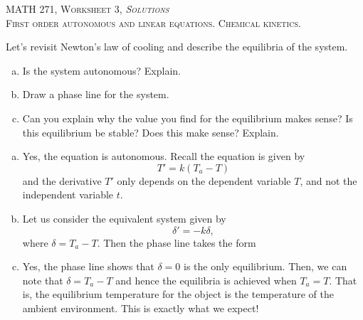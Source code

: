 \documentclass[12pt]{article} %
\begin{document}
\begin{center}
   \textsc{\large MATH 271, Worksheet 3, \emph{Solutions}}\\
   \textsc{First order autonomous and linear equations. Chemical kinetics.}
\end{center}
\vspace{.5cm}


\begin{problem}
    Let's revisit Newton's law of cooling and describe the equilibria of the system. 
\begin{enumerate}[(a)]
    \item Is the system autonomous? Explain.
    \item Draw a phase line for the system.
    \item Can you explain why the value you find for the equilibrium makes sense? Is this equilibrium be stable? Does this make sense? Explain.
\end{enumerate}
\end{problem}
\begin{solution}
    \begin{enumerate}[(a)]
        \item Yes, the equation is autonomous. Recall the equation is given by
        \[
            T' = k(T_a-T)
        \]
        and the derivative $T'$ only depends on the dependent variable $T$, and not the independent variable $t$.
        \item Let us consider the equivalent system given by
        \[
            \delta' = -k\delta,
        \]
        where $\delta = T_a-T$. Then the phase line takes the form
        
                        \begin{centering}
                \end{centering}

        
        \item Yes, the phase line shows that $\delta=0$ is the only equilibrium.  Then, we can note that $\delta = T_a-T$ and hence the equilibria is achieved when $T_a=T$. That is, the equilibrium temperature for the object is the temperature of the ambient environment. This is exactly what we expect!
    \end{enumerate}
\end{solution}
\end{document}
